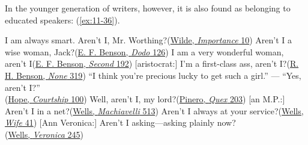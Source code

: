 In the younger generation of writers, however, it is also found as belonging to educated speakers: (\ref{ex:11-36}).

\ea \label{ex:11-36}
\ea
I am always smart. Aren't I, Mr. Worthing?\hfill(\href{https://archive.org/details/bub_gb_4HIWAAAAYAAJ/page/n35/mode/2up?q=%22I+am+always+smart%22&view=theater}{Wilde, \textit{Importance} 10}) %
\ex
Aren't I a wise woman, Jack?\hfill(\href{https://archive.org/details/dododetailofday00bensuoft/page/134/mode/2up?view=theater&q=%22wise+woman%22}{E. F. Benson, \textit{Dodo} 126}) %
\ex
I am a very wonderful woman, aren't I\hfill(\href{https://archive.org/details/dodosecond00bensiala/page/178/mode/2up?view=theater&q=%22very+wonderful+woman%22}{E. F. Benson, \textit{Second} 192}) %
\ex
{}[aristocrat:] I'm a first-class ass, aren't I?\hfill(\href{https://archive.org/details/noneothergods00bens/page/310/mode/2up?view=theater&q=%22first-class+ass%22}{R. H. Benson, \textit{None} 319})
\ex
``I think you're precious lucky to get such a girl.'' --- ``Yes, aren't I?''\\\hfill(\href{https://archive.org/details/comediesofcourts00hopeuoft/page/120/mode/2up?q=%22precious+lucky%22&view=theater}{Hope, \textit{Courtship} 100}) %
\ex
Well, aren't I, my lord?\hfill(\href{https://archive.org/details/gaylordquexcomed00pine/page/168/mode/2up?q=%22aren%27t+I%2C+my+lord%22&view=theater}{Pinero, \textit{Quex} 203})
\ex
{}[an M.P.:] Aren't I in a net?\hfill(\href{https://archive.org/details/newmachiavelli00welluoft/page/476/mode/2up?view=theater&q=%22in+a+net%22}{Wells, \textit{Machiavelli} 513})
\ex
Aren't I always at your service?\hfill(\href{https://archive.org/details/wifeofsirisaacha00well/page/40/mode/2up?view=theater&q=%22aren%27t+i%22}{Wells, \textit{Wife} 41}) %
\ex
{}[Ann Veronica:] Aren’t I asking---asking plainly now?\\\hfill(\href{https://archive.org/details/annveronicamoder0000hgwe/page/260/mode/2up?q=%22aren%27t+i%22&view=theater}{Wells, \textit{Veronica} 245})

